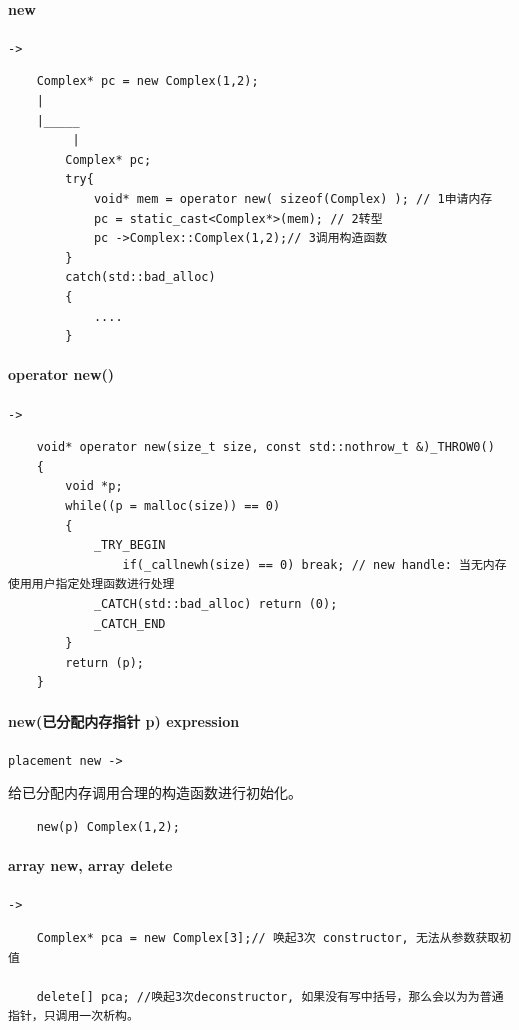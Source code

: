 \documentclass[UTF8,a4paper,12pt]{ctexbook}
\begin{document}
			\newpage
			\paragraph{new}\verb|->|
				\begin{lstlisting}
	Complex* pc = new Complex(1,2);
	|
	|_____
		 |
		Complex* pc;
		try{
			void* mem = operator new( sizeof(Complex) ); // 1申请内存
			pc = static_cast<Complex*>(mem); // 2转型
			pc ->Complex::Complex(1,2);// 3调用构造函数
		} 
		catch(std::bad_alloc)
		{
			....
		}
				\end{lstlisting}
		
			
			\paragraph{operator new()}\verb|->|
				\begin{lstlisting}
	void* operator new(size_t size, const std::nothrow_t &)_THROW0()
	{
		void *p;
		while((p = malloc(size)) == 0)
		{
			_TRY_BEGIN
				if(_callnewh(size) == 0) break; // new handle: 当无内存使用用户指定处理函数进行处理
			_CATCH(std::bad_alloc) return (0);
			_CATCH_END
		}
		return (p);
	}
				\end{lstlisting}
		
			\paragraph{new(已分配内存指针 p) expression} \verb|placement new ->|
			
				给已分配内存调用合理的构造函数进行初始化。
				 
				\begin{lstlisting}
	new(p) Complex(1,2);				
				\end{lstlisting}
				
			\newpage
			\paragraph{array new, array delete}\verb|->|
				\begin{lstlisting}
	Complex* pca = new Complex[3];// 唤起3次 constructor, 无法从参数获取初值
	
	delete[] pca; //唤起3次deconstructor, 如果没有写中括号，那么会以为为普通指针，只调用一次析构。
				\end{lstlisting}
				
\end{document}
